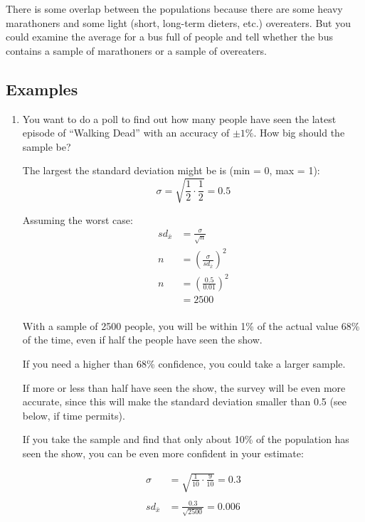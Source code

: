 \documentclass[portrait]{exam}
\begin{document}
  There is some overlap between the populations because there are some heavy
  marathoners and some light (short, long-term dieters, etc.) overeaters. But
  you could examine the average for a bus full of people and tell whether the
  bus contains a sample of marathoners or a sample of overeaters.

  \subsection{Examples}
  \begin{enumerate}

    \item You want to do a poll to find out how many people have seen the latest
      episode of ``Walking Dead'' with an accuracy of $\pm 1\%$. How big should
      the sample be? 

      \begin{solution}
        The largest the standard deviation might be is (min = 0, max = 1):
        \[
          \sigma = \sqrt{\frac{1}{2} \cdot \frac{1}{2}} = 0.5
        \]

        Assuming the worst case:
        \begin{align*}
          sd_{\bar{x}} & = \frac{\sigma}{\sqrt{n}} \\
          n            & = \left( \frac{\sigma}{sd_{\bar{x}}} \right)^2 \\
          n            & = \left( \frac{0.5}{0.01} \right)^2 \\
                       & = 2500 \\
        \end{align*}

        With a sample of 2500 people, you will be within 1\% of the actual value
        68\% of the time, even if half the people have seen the show. 
        
        If you need a higher than 68\% confidence, you could take a larger
        sample.

        If more or less than half have seen the show, the survey will be even
        more accurate, since this will make the standard deviation smaller than
        0.5 (see below, if time permits).

        If you take the sample and find that only about 10\% of the population
        has seen the show, you can be even more confident in your estimate:

        \begin{align*}
          \sigma & = \sqrt{\frac{1}{10} \cdot \frac{9}{10}} = 0.3 \\
          \\
          sd_{\bar{x}} & = \frac{0.3}{\sqrt{2500}} = 0.006 \\
        \end{align*}


\end{solution}
\end{enumerate}
\end{document}
